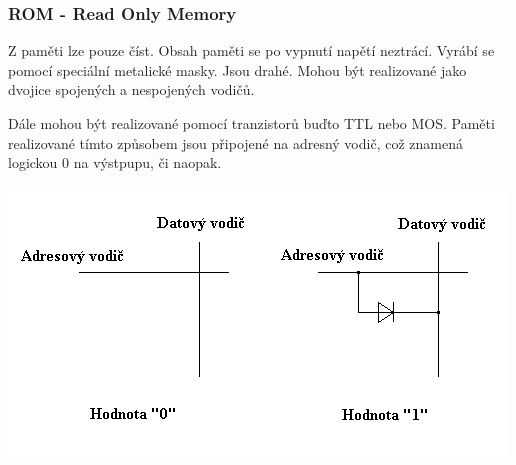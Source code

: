 \subsubsection{ROM - Read Only Memory}
\begin{multicols}{2}
    Z paměti lze pouze číst.
    Obsah paměti se po vypnutí napětí neztrácí.
    Vyrábí se pomocí speciální metalické masky.
    Jsou drahé.
    Mohou být realizované jako dvojice spojených a nespojených vodičů.

    Dále mohou být realizované pomocí tranzistorů buďto TTL nebo MOS.
    Paměti realizované tímto způsobem jsou připojené na adresný vodič, což znamená logickou 0 na výstpupu, či naopak.
    \columnbreak

    \includegraphics[width=\linewidth]{TVY-POS/Polovodicove-pameti/ROM.png}
\end{multicols}
